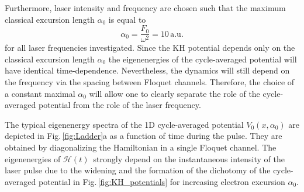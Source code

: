\documentclass[
pra%
,preprint%
,amssymb, nobibnotes, aps, superscriptaddress, floatfix]{revtex4}
\newcommand{\fig}{Fig.\,}
\newcommand{\av}{\boldsymbol{\alpha}}
\newcommand{\as}{\alpha}
\newcommand{\CAHt}{$\mathcal{H}(t)$}
\begin{document}
Furthermore, laser intensity and frequency are chosen such that the maximum classical excursion length $\as_0$ is equal to 
\begin{equation}
\alpha_0 = \frac{F_0}{\omega^2} = 10 \, \text{a.u.}
\end{equation}
for all laser frequencies investigated. Since the KH potential depends only on the classical excursion length $\as_0$  the eigenenergies of the cycle-averaged potential will have identical time-dependence. Nevertheless, the dynamics will still depend on the frequency via the spacing between Floquet channels.  Therefore, the choice of a constant maximal $\as_0$ will allow one to clearly separate the role of the cycle-averaged potential from the role of the laser frequency.




The typical eigenenergy spectra of the 1D cycle-averaged potential $V_0(x, \as_0)$ are depicted in \fig \ref{fig:Ladder}a as a function of time during the pulse. They are obtained by diagonalizing the Hamiltonian in a single Floquet channel. %
The eigenenergies of \CAHt\ strongly depend on the instantaneous intensity of the laser pulse due to the widening and the formation of the dichotomy of the cycle-averaged potential in \fig \ref{fig:KH_potentials} for increasing electron excursion $\as_0$. 
\end{document}
